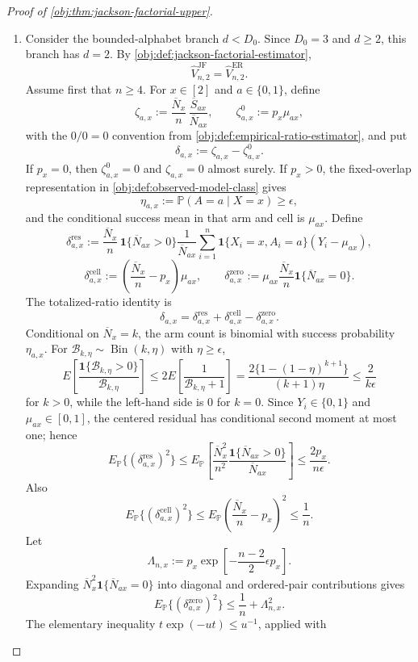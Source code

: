 \documentclass[11pt]{article}
\begin{document}
\begin{proof}[Proof of \cref{obj:thm:jackson-factorial-upper}]
\begin{enumerate}
\item Consider the bounded-alphabet branch \(d<D_0\).  Since \(D_0=3\) and
\(d\ge2\), this branch has \(d=2\).  By
\cref{obj:def:jackson-factorial-estimator},
\[
\widehat V_{n,2}^{\mathrm{JF}}
=
\widehat V_{n,2}^{\mathrm{ER}} .
\]
Assume first that \(n\ge4\).  For \(x\in[2]\) and \(a\in\{0,1\}\), define
\[
\zeta_{a,x}
:=
\frac{\overline N_x}{n}\,
\frac{\overline S_{ax}}{\overline N_{ax}},
\qquad
\zeta^0_{a,x}:=p_x\mu_{ax},
\]
with the \(0/0=0\) convention from
\cref{obj:def:empirical-ratio-estimator}, and put
\[
\delta_{a,x}:=\zeta_{a,x}-\zeta^0_{a,x}.
\]
If \(p_x=0\), then \(\zeta^0_{a,x}=0\) and \(\zeta_{a,x}=0\) almost surely.
If \(p_x>0\), the fixed-overlap representation in
\cref{obj:def:observed-model-class} gives
\[
\eta_{a,x}:=\mathbb P(A=a\mid X=x)\ge\epsilon ,
\]
and the conditional success mean in that arm and cell is \(\mu_{ax}\).  Define
\[
\delta^{\mathrm{res}}_{a,x}
:=
\frac{\overline N_x}{n}\,
\mathbf 1\{\overline N_{ax}>0\}
\frac{1}{\overline N_{ax}}
\sum_{i=1}^n
\mathbf 1\{X_i=x,A_i=a\}(Y_i-\mu_{ax}),
\]
\[
\delta^{\mathrm{cell}}_{a,x}
:=
\left(\frac{\overline N_x}{n}-p_x\right)\mu_{ax},
\qquad
\delta^{\mathrm{zero}}_{a,x}
:=
\mu_{ax}\frac{\overline N_x}{n}\mathbf 1\{\overline N_{ax}=0\}.
\]
The totalized-ratio identity is
\[
\delta_{a,x}
=
\delta^{\mathrm{res}}_{a,x}
+
\delta^{\mathrm{cell}}_{a,x}
-
\delta^{\mathrm{zero}}_{a,x}.
\]
Conditional on \(\overline N_x=k\), the arm count is binomial with success
probability \(\eta_{a,x}\).  For
\(\mathcal B_{k,\eta}\sim\operatorname{Bin}(k,\eta)\) with
\(\eta\ge\epsilon\),
\[
E\!\left[\frac{\mathbf 1\{\mathcal B_{k,\eta}>0\}}{\mathcal B_{k,\eta}}\right]
\le
2E\!\left[\frac{1}{\mathcal B_{k,\eta}+1}\right]
=
\frac{2\{1-(1-\eta)^{k+1}\}}{(k+1)\eta}
\le
\frac{2}{k\epsilon}
\]
for \(k>0\), while the left-hand side is \(0\) for \(k=0\).  Since
\(Y_i\in\{0,1\}\) and \(\mu_{ax}\in[0,1]\), the centered residual has
conditional second moment at most one; hence
\[
E_{\mathbb P}\{(\delta^{\mathrm{res}}_{a,x})^2\}
\le
E_{\mathbb P}\!\left[
\frac{\overline N_x^2}{n^2}
\frac{\mathbf 1\{\overline N_{ax}>0\}}{\overline N_{ax}}
\right]
\le
\frac{2p_x}{n\epsilon}.
\]
Also
\[
E_{\mathbb P}\{(\delta^{\mathrm{cell}}_{a,x})^2\}
\le
E_{\mathbb P}\left(\frac{\overline N_x}{n}-p_x\right)^2
\le
\frac1n .
\]
Let
\[
\Lambda_{n,x}:=
p_x\exp\!\left[-\frac{n-2}{2}\epsilon p_x\right].
\]
Expanding
\(\overline N_x^2\mathbf 1\{\overline N_{ax}=0\}\) into diagonal and
ordered-pair contributions gives
\[
E_{\mathbb P}\{(\delta^{\mathrm{zero}}_{a,x})^2\}
\le
\frac1n+\Lambda_{n,x}^2 .
\]
The elementary inequality \(t\exp(-ut)\le u^{-1}\), applied with

\end{enumerate}
\end{proof}
\end{document}
